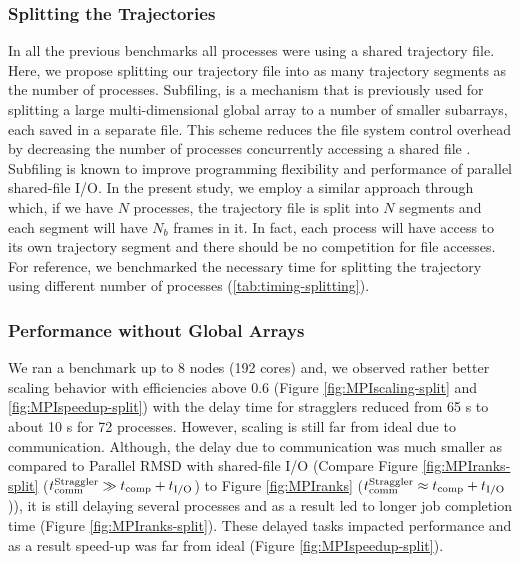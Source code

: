 \subsubsection{Splitting the Trajectories}
\label{splitting-traj}
In all the previous benchmarks all processes were using a shared trajectory file.
Here, we propose splitting our trajectory file into as many trajectory segments as the number of processes.
Subfiling, is a mechanism that is previously used for splitting a large multi-dimensional global array to a number of smaller subarrays, each saved in a separate file. 
This scheme reduces the file system control overhead by decreasing the number of processes concurrently accessing a shared file \cite{scalable-IO, scalable-IO1}.
Subfiling is known to improve programming flexibility and performance of parallel shared-file I/O. 
In the present study, we employ a similar approach through which, if we have $N$ processes, the trajectory file is split into $N$ segments and each segment will have $N_{b}$ frames in it. 
In fact, each process will have access to its own trajectory segment and there should be no competition for file accesses. 
For reference, we benchmarked the necessary time for splitting the trajectory using different number of processes (\ref{tab:timing-splitting}).

\subsubsection*{Performance without Global Arrays}
We ran a benchmark up to 8 nodes (192 cores) and, we observed rather better scaling behavior with efficiencies above 0.6 (Figure \ref{fig:MPIscaling-split} and \ref{fig:MPIspeedup-split}) with the delay time for stragglers reduced from 65 s to about 10 s for 72 processes. 
However, scaling is still far from ideal due to communication. 
Although, the delay due to communication was much smaller as compared to Parallel RMSD with shared-file I/O (Compare Figure \ref{fig:MPIranks-split} ($t_{\text{comm}}^{\text{Straggler}} \gg {t}_{\text{comp}}+{t}_{\text{I/O}}$) to Figure \ref{fig:MPIranks} ($t_{\text{comm}}^{\text{Straggler}} \approx {t}_{\text{comp}}+{t}_{\text{I/O}}$)), it is still delaying several processes and as a result led to longer job completion time (Figure \ref{fig:MPIranks-split}). 
These delayed tasks impacted performance and as a result speed-up was far from ideal (Figure \ref{fig:MPIspeedup-split}).

